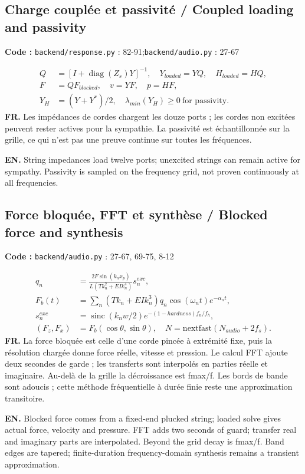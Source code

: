 \documentclass[10pt,a4paper]{article}
\newcommand{\FR}[1]{\textbf{FR.} #1\par}\newcommand{\EN}[1]{{\selectlanguage{english}\textbf{EN.} #1\par}}
\newcommand{\loc}[1]{{\small\color{ink}\textbf{Code :} #1\par}}
\newcommand{\sinc}{\operatorname{sinc}}\newcommand{\clip}{\operatorname{clip}}\newcommand{\diag}{\operatorname{diag}}\newcommand{\Rea}{\operatorname{Re}}\newcommand{\rms}{\operatorname{RMS}}
\begin{document}
\begin{samepage}\subsection{Charge couplée et passivité / Coupled loading and passivity}
\loc{\texttt{backend/response.py} : 82-91;\allowbreak\quad \texttt{backend/audio.py} : 27-67}
\begin{align}Q&=[I+\diag(Z_s)Y]^{-1},\quad Y_{loaded}=YQ,\quad H_{loaded}=HQ,\\
F&=QF_{blocked},\quad v=YF,\quad p=HF,\\
Y_H&=(Y+Y^*)/2,\quad\lambda_{min}(Y_H)\geq0\ \text{for passivity}.\end{align}
\FR{Les impédances de cordes chargent les douze ports ; les cordes non excitées peuvent rester actives pour la sympathie. La passivité est échantillonnée sur la grille, ce qui n’est pas une preuve continue sur toutes les fréquences.}
\EN{String impedances load twelve ports; unexcited strings can remain active for sympathy. Passivity is sampled on the frequency grid, not proven continuously at all frequencies.}
\end{samepage}
\begin{samepage}\subsection{Force bloquée, FFT et synthèse / Blocked force and synthesis}
\loc{\texttt{backend/audio.py} : 27-67, 69-75, 8-12}
\begin{align}q_n&=\frac{2F\sin(k_nx_p)}{L(Tk_n^2+EI k_n^4)}s_n^{exc},\\
F_b(t)&=\sum_n(Tk_n+EI k_n^3)q_n\cos(\omega_nt)e^{-\alpha_nt},\\
s_n^{exc}&=\sinc(k_nw/2)e^{-(1-hardness)f_n/f_h},\\
(F_z,F_x)&=F_b(\cos\theta,\sin\theta),\quad N=\mathrm{nextfast}(N_{audio}+2f_s).\end{align}
\FR{La force bloquée est celle d’une corde pincée à extrémité fixe, puis la résolution chargée donne force réelle, vitesse et pression. Le calcul FFT ajoute deux secondes de garde ; les transferts sont interpolés en parties réelle et imaginaire. Au-delà de la grille la décroissance est fmax/f. Les bords de bande sont adoucis ; cette méthode fréquentielle à durée finie reste une approximation transitoire.}
\EN{Blocked force comes from a fixed-end plucked string; loaded solve gives actual force, velocity and pressure. FFT adds two seconds of guard; transfer real and imaginary parts are interpolated. Beyond the grid decay is fmax/f. Band edges are tapered; finite-duration frequency-domain synthesis remains a transient approximation.}
\end{samepage}
\end{document}
